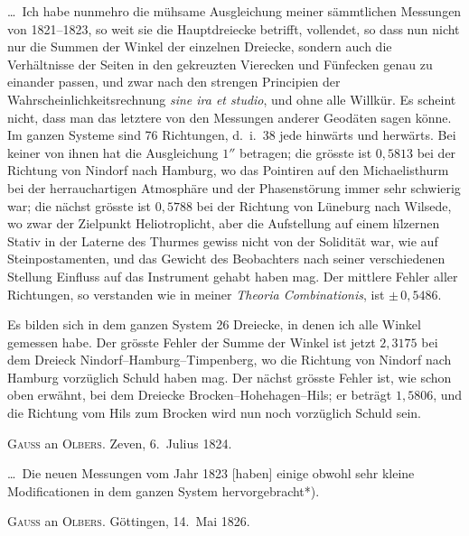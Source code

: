 \documentclass[12pt,a4paper]{article}
\theoremstyle{plain}
\theoremstyle{definition}
\theoremstyle{remark}
\begin{document}
\ldots\ Ich habe nunmehro die m\"uhsame Ausgleichung meiner s\"ammtlichen Messungen von 1821--1823, so weit sie die Hauptdreiecke betrifft, vollendet, so dass nun nicht nur die Summen der Winkel der einzelnen Dreiecke, sondern auch die Verh\"altnisse der Seiten in den gekreuzten Vierecken und F\"unfecken genau zu einander passen, und zwar nach den strengen Principien der Wahrscheinlichkeitsrechnung \textit{sine ira et studio}, und ohne alle Willk\"ur. Es scheint nicht, dass man das letztere von den Messungen anderer Geod\"aten sagen k\"onne. Im ganzen Systeme sind 76 Richtungen, d.\ i.\ 38 jede hinw\"arts und herw\"arts. Bei keiner von ihnen hat die Ausgleichung $1''$ betragen; die gr\"osste ist $0{,}5813$ bei der Richtung von Nindorf nach Hamburg, wo das Pointiren auf den Michaelisthurm bei der herrauchartigen Atmosph\"are und der Phasenst\"orung immer sehr schwierig war; die n\"achst gr\"osste ist $0{,}5788$ bei der Richtung von L\"uneburg nach Wilsede, wo zwar der Zielpunkt Heliotroplicht, aber die Aufstellung auf einem h\"lzernen Stativ in der Laterne des Thurmes gewiss nicht von der Solidit\"at war, wie auf Steinpostamenten, und das Gewicht des Beobachters nach seiner verschiedenen Stellung Einfluss auf das Instrument gehabt haben mag. Der mittlere Fehler aller Richtungen, so verstanden wie in meiner \textit{Theoria Combinationis}, ist $\pm\,0{,}5486$.

Es bilden sich in dem ganzen System 26 Dreiecke, in denen ich alle Winkel gemessen habe. Der gr\"osste Fehler der Summe der Winkel ist jetzt $2{,}3175$ bei dem Dreieck Nindorf--Hamburg--Timpenberg, wo die Richtung von Nindorf nach Hamburg vorz\"uglich Schuld haben mag. Der n\"achst gr\"osste Fehler ist, wie schon oben erw\"ahnt, bei dem Dreiecke Brocken--Hohehagen--Hils; er betr\"agt $1{,}5806$, und die Richtung vom Hils zum Brocken wird nun noch vorz\"uglich Schuld sein.

\medskip\noindent
\textsc{Gauss} an \textsc{Olbers}. Zeven, 6.\ Julius 1824.

\ldots\ Die neuen Messungen vom Jahr 1823 [haben] einige obwohl sehr kleine Modificationen in dem ganzen System hervorgebracht*).

\medskip\noindent
\textsc{Gauss} an \textsc{Olbers}. G\"ottingen, 14.\ Mai 1826.
\end{document}
